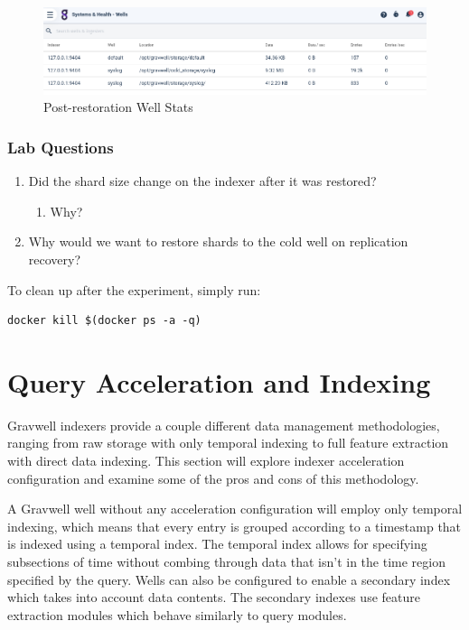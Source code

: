 {\begin{figure}
	\includegraphics{images/replication-restore.png}
	\caption{Post-restoration Well Stats}
\end{figure}

\subsubsection{Lab Questions}

\begin{enumerate}
	\item Did the shard size change on the indexer after it was restored?
	\begin{enumerate}
		\item Why?
	\end{enumerate}
	\item Why would we want to restore shards to the cold well on replication recovery?
\end{enumerate}

To clean up after the experiment, simply run:

\begin{Verbatim}[breaklines=true]
docker kill $(docker ps -a -q)
\end{Verbatim}

\section{Query Acceleration and Indexing}
\label{sec:acceleration}
Gravwell indexers provide a couple different data management
methodologies, ranging from raw storage with only temporal indexing to
full feature extraction with direct data indexing. This section
will explore indexer acceleration configuration and examine some of the
pros and cons of this methodology.

A Gravwell well without any acceleration configuration will employ only
temporal indexing, which means that every entry is grouped according to a
timestamp that is indexed using a temporal index. The temporal index
allows for specifying subsections of time without combing through data
that isn't in the time region specified by the query. Wells can also be
configured to enable a secondary index which takes into account data
contents. The secondary indexes use feature extraction modules which
behave similarly to query modules.

}
